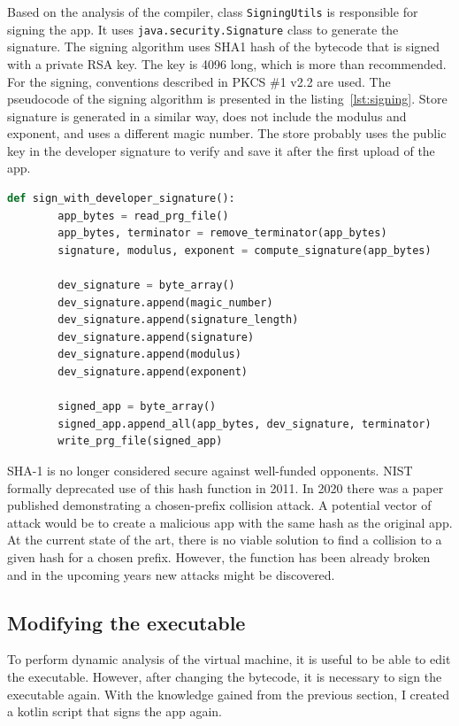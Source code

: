 Based on the analysis of the compiler, class \texttt{SigningUtils} is responsible for signing the app.
It uses \texttt{java.security.Signature} class to generate the signature.
The signing algorithm uses SHA1 hash of the bytecode that is signed with a private RSA key.
The key is 4096 long, which is more than recommended.
For the signing, conventions described in PKCS \#1 v2.2 are used\cite{java-signature,pkcs}.
The pseudocode of the signing algorithm is presented in the listing~\ref{lst:signing}.
Store signature is generated in a similar way, does not include the modulus and exponent, and uses a different magic number.
The store probably uses the public key in the developer signature to verify and save it after the first upload of the app.
\begin{lstlisting}[caption={Pseudocode of the signing algorithm, developer signature},captionpos=b,label={lst:signing},language=Python]
    def sign_with_developer_signature():
        app_bytes = read_prg_file()
        app_bytes, terminator = remove_terminator(app_bytes)
        signature, modulus, exponent = compute_signature(app_bytes)

        dev_signature = byte_array()
        dev_signature.append(magic_number)
        dev_signature.append(signature_length)
        dev_signature.append(signature)
        dev_signature.append(modulus)
        dev_signature.append(exponent)

        signed_app = byte_array()
        signed_app.append_all(app_bytes, dev_signature, terminator)
        write_prg_file(signed_app)
\end{lstlisting}

SHA-1 is no longer considered secure against well-funded opponents.
NIST formally deprecated use of this hash function in 2011.
In 2020 there was a paper published demonstrating a chosen-prefix collision attack.
A potential vector of attack would be to create a malicious app with the same hash as the original app.
At the current state of the art, there is no viable solution to find a collision to a given hash for a chosen prefix.
However, the function has been already broken and in the upcoming years new attacks might be discovered.

\subsection{Modifying the executable}
To perform dynamic analysis of the virtual machine, it is useful to be able to edit the executable.
However, after changing the bytecode, it is necessary to sign the executable again.
With the knowledge gained from the previous section, I created a kotlin script that signs the app again.

